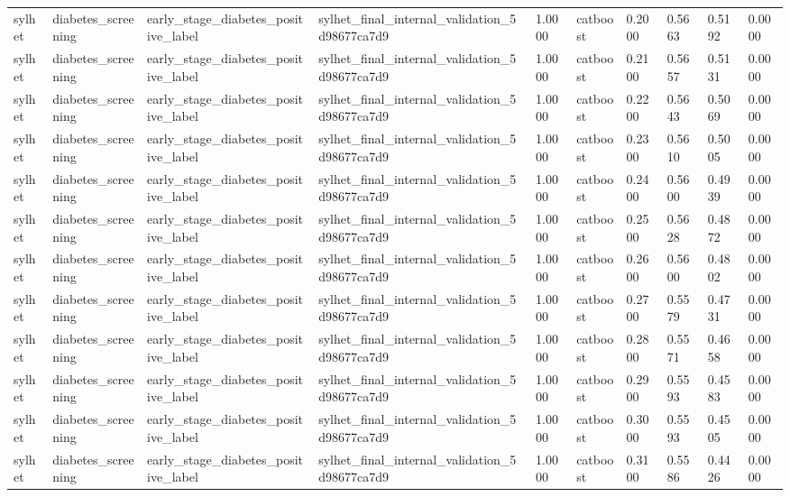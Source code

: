 \begin{tabular}{llllllllll}
sylhet & diabetes\_screening & early\_stage\_diabetes\_positive\_label & sylhet\_final\_internal\_validation\_5d98677ca7d9 & 1.0000 & catboost & 0.2000 & 0.5663 & 0.5192 & 0.0000 \\
sylhet & diabetes\_screening & early\_stage\_diabetes\_positive\_label & sylhet\_final\_internal\_validation\_5d98677ca7d9 & 1.0000 & catboost & 0.2100 & 0.5657 & 0.5131 & 0.0000 \\
sylhet & diabetes\_screening & early\_stage\_diabetes\_positive\_label & sylhet\_final\_internal\_validation\_5d98677ca7d9 & 1.0000 & catboost & 0.2200 & 0.5643 & 0.5069 & 0.0000 \\
sylhet & diabetes\_screening & early\_stage\_diabetes\_positive\_label & sylhet\_final\_internal\_validation\_5d98677ca7d9 & 1.0000 & catboost & 0.2300 & 0.5610 & 0.5005 & 0.0000 \\
sylhet & diabetes\_screening & early\_stage\_diabetes\_positive\_label & sylhet\_final\_internal\_validation\_5d98677ca7d9 & 1.0000 & catboost & 0.2400 & 0.5600 & 0.4939 & 0.0000 \\
sylhet & diabetes\_screening & early\_stage\_diabetes\_positive\_label & sylhet\_final\_internal\_validation\_5d98677ca7d9 & 1.0000 & catboost & 0.2500 & 0.5628 & 0.4872 & 0.0000 \\
sylhet & diabetes\_screening & early\_stage\_diabetes\_positive\_label & sylhet\_final\_internal\_validation\_5d98677ca7d9 & 1.0000 & catboost & 0.2600 & 0.5600 & 0.4802 & 0.0000 \\
sylhet & diabetes\_screening & early\_stage\_diabetes\_positive\_label & sylhet\_final\_internal\_validation\_5d98677ca7d9 & 1.0000 & catboost & 0.2700 & 0.5579 & 0.4731 & 0.0000 \\
sylhet & diabetes\_screening & early\_stage\_diabetes\_positive\_label & sylhet\_final\_internal\_validation\_5d98677ca7d9 & 1.0000 & catboost & 0.2800 & 0.5571 & 0.4658 & 0.0000 \\
sylhet & diabetes\_screening & early\_stage\_diabetes\_positive\_label & sylhet\_final\_internal\_validation\_5d98677ca7d9 & 1.0000 & catboost & 0.2900 & 0.5593 & 0.4583 & 0.0000 \\
sylhet & diabetes\_screening & early\_stage\_diabetes\_positive\_label & sylhet\_final\_internal\_validation\_5d98677ca7d9 & 1.0000 & catboost & 0.3000 & 0.5593 & 0.4505 & 0.0000 \\
sylhet & diabetes\_screening & early\_stage\_diabetes\_positive\_label & sylhet\_final\_internal\_validation\_5d98677ca7d9 & 1.0000 & catboost & 0.3100 & 0.5586 & 0.4426 & 0.0000 \\

\end{tabular}
